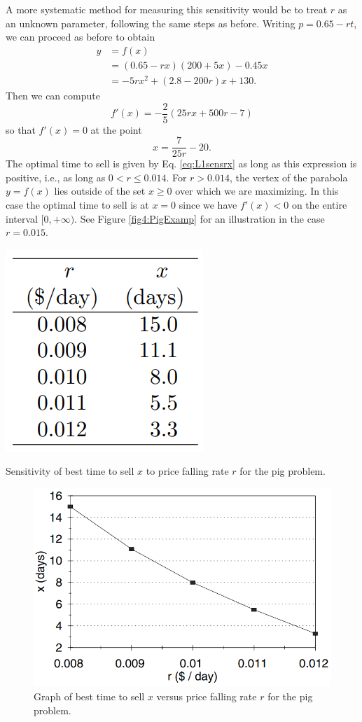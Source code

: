 A more systematic method for measuring this sensitivity would be to treat $r$ as an unknown parameter, following the same steps as before. Writing $p=0.65-rt$, we can proceed as before to obtain
\begin{align*}
y&=f(x)\\
&=(0.65-rx)(200+5x)-0.45x\\
&=-5rx^2+(2.8-200r)x+130.
\end{align*}
Then we can compute
$$
f'(x)=-\frac{2}{5}(25rx+500r-7)
$$
so that $f'(x)=0$ at the point
\begin{equation}\label{eq:L1sensrx}
x=\frac{7}{25r}-20.
\end{equation}
The optimal time to sell is given by Eq. \eqref{eq:L1sensrx} as long as this expression is
positive, i.e., as long as $0<r\leq0.014$. For $r>0.014$, the vertex of the parabola $y=f(x)$ lies outside of the set $x\geq0$ over which we are maximizing. In this case the optimal time to sell is at $x=0$ since we have $f'(x)<0$ on the entire interval $[0,+\infty)$. See Figure \ref{fig4:PigExamp} for an illustration in the case $r=0.015$.
\begin{table}[htbp]
\centering
\includegraphics[scale=0.4]{figs/PigExampFig2.png}
\caption{Sensitivity of best time to sell $x$ to price falling rate $r$ for the pig problem.}
\label{fig2:PigExamp}
\end{table}

\begin{figure}[htbp]
\centering
\includegraphics[scale=0.4]{figs/PigExampFig3.png}
\caption{Graph of best time to sell $x$ versus price falling rate $r$ for the pig problem.}
\label{fig3:PigExamp}
\end{figure}


